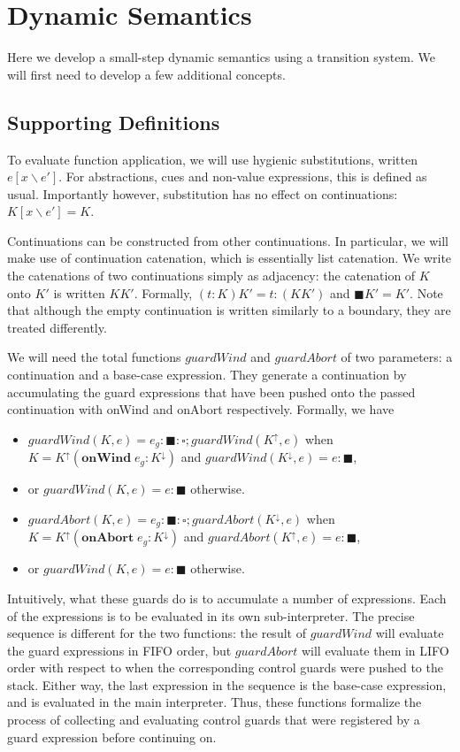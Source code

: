 \documentclass[11pt]{article}
\begin{document}
\section{Dynamic Semantics}
\label{sec:evaluation}

Here we develop a small-step dynamic semantics using a transition system.
We will first need to develop a few additional concepts.

\subsection{Supporting Definitions}

To evaluate function application, we will use hygienic substitutions, written $e[x\backslash e']$.
For abstractions, cues and non-value expressions, this is defined as usual.
Importantly however, substitution has no effect on continuations: $K[x\backslash e'] = K$.

Continuations can be constructed from other continuations.
In particular, we will make use of continuation catenation, which is essentially list catenation.
We write the catenations of two continuations simply as adjacency: the catenation of $K$ onto $K'$ is written $KK'$.
Formally, $(t:K)K' = t:(KK')$ and $\blacksquare K' = K'$.
Note that although the empty continuation is written similarly to a boundary, they are treated differently.

We will need the total functions $guardWind$ and $guardAbort$ of two parameters: a continuation and a base-case expression.
They generate a continuation by accumulating the guard expressions that have been pushed onto the passed continuation with \textsf{onWind} and \textsf{onAbort} respectively.
Formally, we have
\begin{itemize}
\item $guardWind(K, e) = e_g : \blacksquare : \square; guardWind(K^\uparrow, e)$ when $K = K^\uparrow(\textbf{onWind}\;e_g:K^\downarrow)$ and $guardWind(K^\downarrow, e) = e:\blacksquare$,
\item or $guardWind(K, e) = e:\blacksquare$ otherwise.
\item $guardAbort(K, e) = e_g : \blacksquare : \square; guardAbort(K^\downarrow, e)$ when $K = {K^\uparrow(\textbf{onAbort}\;e_g:K^\downarrow)}$ and $guardAbort(K^\uparrow, e) = e:\blacksquare$,
\item or $guardWind(K, e) = e:\blacksquare$ otherwise.
\end{itemize}

Intuitively, what these guards do is to accumulate a number of expressions.
Each of the expressions is to be evaluated in its own sub-interpreter.
The precise sequence is different for the two functions: the result of $guardWind$ will evaluate the guard expressions in FIFO order, but $guardAbort$ will evaluate them in LIFO order with respect to when the corresponding control guards were pushed to the stack.
Either way, the last expression in the sequence is the base-case expression, and is evaluated in the main interpreter.
Thus, these functions formalize the process of collecting and evaluating control guards that were registered by a guard expression before continuing on.
\end{document}
